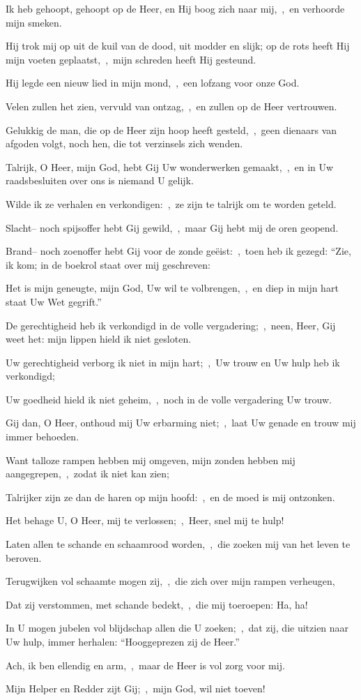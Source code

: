 \documentclass[12pt,twoside,a5paper]{article}
\begin{document}
\begin{halfparskip}
   Ik heb gehoopt, gehoopt op de Heer, en Hij boog zich naar mij,~\sep\ en verhoorde mijn smeken.

  Hij trok mij op uit de kuil van de dood, uit modder en slijk; op de rots heeft Hij mijn voeten geplaatst,~\sep\ mijn schreden heeft Hij gesteund.

  Hij legde een nieuw lied in mijn mond,~\sep\ een lofzang voor onze God.

  Velen zullen het zien, vervuld van ontzag,~\sep\ en zullen op de Heer vertrouwen.

  Gelukkig de man, die op de Heer zijn hoop heeft gesteld,~\sep\ geen dienaars van afgoden volgt, noch hen, die tot verzinsels zich wenden.

  Talrijk, O Heer, mijn God, hebt Gij Uw wonderwerken gemaakt,~\sep\ en in Uw raadsbesluiten over ons is niemand U gelijk.

  Wilde ik ze verhalen en verkondigen:~\sep\ ze zijn te talrijk om te worden geteld.

  Slacht-- noch spijsoffer hebt Gij gewild,~\sep\ maar Gij hebt mij de oren geopend.

  Brand-- noch zoenoffer hebt Gij voor de zonde geëist:~\sep\ toen heb ik gezegd: ``Zie, ik kom; in de boekrol staat over mij geschreven:

  Het is mijn geneugte, mijn God, Uw wil te volbrengen,~\sep\ en diep in mijn hart staat Uw Wet gegrift.''

  De gerechtigheid heb ik verkondigd in de volle vergadering;~\sep\ neen, Heer, Gij weet het: mijn lippen hield ik niet gesloten.

  Uw gerechtigheid verborg ik niet in mijn hart;~\sep\ Uw trouw en Uw hulp heb ik verkondigd;

  Uw goedheid hield ik niet geheim,~\sep\ noch in de volle vergadering Uw trouw.

  Gij dan, O Heer, onthoud mij Uw erbarming niet;~\sep\ laat Uw genade en trouw mij immer behoeden.

  Want talloze rampen hebben mij omgeven, mijn zonden hebben mij aangegrepen,~\sep\ zodat ik niet kan zien;

  Talrijker zijn ze dan de haren op mijn hoofd:~\sep\ en de moed is mij ontzonken.

  Het behage U, O Heer, mij te verlossen;~\sep\ Heer, snel mij te hulp!

  Laten allen te schande en schaamrood worden,~\sep\ die zoeken mij van het leven te beroven.

  Terugwijken vol schaamte mogen zij,~\sep\ die zich over mijn rampen verheugen,

  Dat zij verstommen, met schande bedekt,~\sep\ die mij toeroepen: Ha, ha!

  In U mogen jubelen vol blijdschap allen die U zoeken;~\sep\ dat zij, die uitzien naar Uw hulp, immer herhalen: ``Hooggeprezen zij de Heer.''

  Ach, ik ben ellendig en arm,~\sep\ maar de Heer is vol zorg voor mij.

  Mijn Helper en Redder zijt Gij;~\sep\ mijn God, wil niet toeven!
\end{halfparskip}
\end{document}
